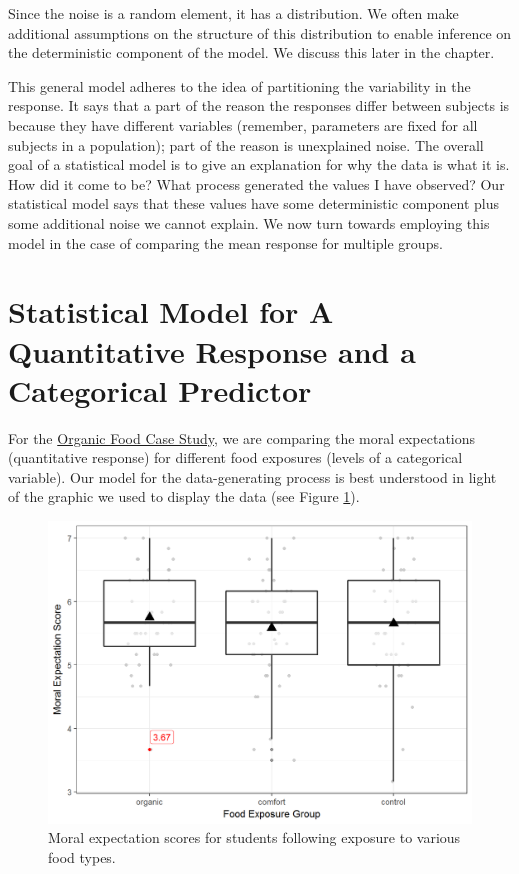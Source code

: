 \documentclass[]{book}
\theoremstyle{definition}
\theoremstyle{definition}
\theoremstyle{remark}
\begin{document}
Since the noise is a random element, it has a distribution. We often
make additional assumptions on the structure of this distribution to
enable inference on the deterministic component of the model. We discuss
this later in the chapter.

This general model adheres to the idea of partitioning the variability
in the response. It says that a part of the reason the responses differ
between subjects is because they have different variables (remember,
parameters are fixed for all subjects in a population); part of the
reason is unexplained noise. The overall goal of a statistical model is
to give an explanation for why the data is what it is. How did it come
to be? What process generated the values I have observed? Our
statistical model says that these values have some deterministic
component plus some additional noise we cannot explain. We now turn
towards employing this model in the case of comparing the mean response
for multiple groups.

\section{Statistical Model for A Quantitative Response and a Categorical
Predictor}\label{statistical-model-for-a-quantitative-response-and-a-categorical-predictor}

For the \protect\hyperlink{CaseOrganic}{Organic Food Case Study}, we are
comparing the moral expectations (quantitative response) for different
food exposures (levels of a categorical variable). Our model for the
data-generating process is best understood in light of the graphic we
used to display the data (see Figure \ref{fig:anovamodel-organic-plot}).

\begin{figure}

{\centering \includegraphics[width=0.8\linewidth]{./Images/anovamodel-organic-plot-1} 

}

\caption{Moral expectation scores for students following exposure to various food types.}\label{fig:anovamodel-organic-plot}
\end{figure}
\end{document}
